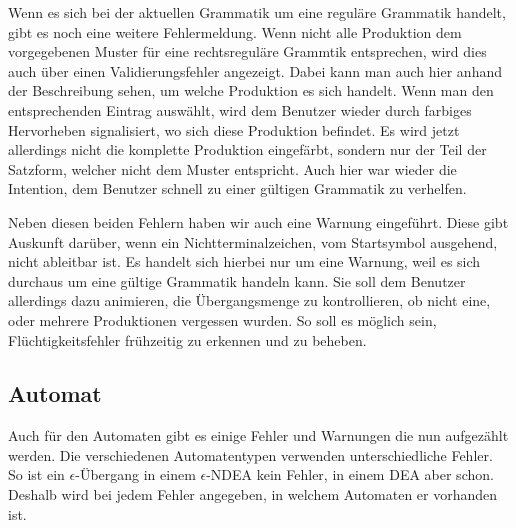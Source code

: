 Wenn es sich bei der aktuellen Grammatik um eine reguläre Grammatik handelt,
gibt es noch eine weitere Fehlermeldung. Wenn nicht alle Produktion dem
vorgegebenen Muster für eine rechtsreguläre Grammtik entsprechen, wird dies auch
über einen Validierungsfehler angezeigt. Dabei kann man auch hier anhand der
Beschreibung sehen, um welche Produktion es sich handelt. Wenn man den
entsprechenden Eintrag auswählt, wird dem Benutzer wieder durch farbiges
Hervorheben signalisiert, wo sich diese Produktion befindet. Es wird jetzt
allerdings nicht die komplette Produktion eingefärbt, sondern nur der Teil der
Satzform, welcher nicht dem Muster entspricht. Auch hier war wieder die
Intention, dem Benutzer schnell zu einer gültigen Grammatik zu
verhelfen.\vspace{10pt}

Neben diesen beiden Fehlern haben wir auch eine Warnung eingeführt. Diese gibt
Auskunft darüber, wenn ein Nichtterminalzeichen, vom Startsymbol ausgehend,
nicht ableitbar ist. Es handelt sich hierbei nur um eine Warnung, weil es sich
durchaus um eine gültige Grammatik handeln kann. Sie soll dem Benutzer allerdings
dazu animieren, die Übergangsmenge zu kontrollieren, ob nicht eine, oder mehrere
Produktionen vergessen wurden. So soll es möglich sein, Flüchtig\-keits\-fehler
frühzeitig zu erkennen und zu beheben.\vspace{10pt}

\subsection{Automat}\label{InteractionMachine}

Auch für den Automaten gibt es einige Fehler und Warnungen die nun aufgezählt
werden. Die verschiedenen Automatentypen verwenden unterschiedliche Fehler. So
ist ein $\epsilon$-Übergang in einem $\epsilon$-NDEA kein Fehler, in einem DEA
aber schon. Deshalb wird bei jedem Fehler angegeben, in welchem Automaten er
vorhanden ist.\vspace{10pt}

